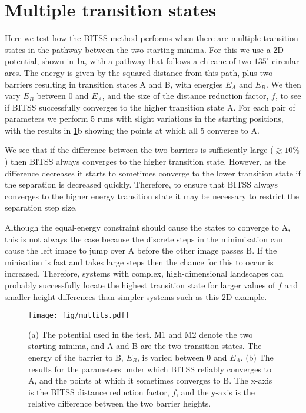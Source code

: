 \documentclass[10pt]{revtex4}
\begin{document}
\section{Multiple transition states}
Here we test how the BITSS method performs when there are multiple transition states in the pathway between the two starting minima.
For this we use a 2D potential, shown in \cref{fig:multits}a, with a pathway that follows a chicane of two $135^\circ$ circular arcs.
The energy is given by the squared distance from this path, plus two barriers resulting in transition states A and B, with energies $E_A$ and $E_B$.
We then vary $E_B$ between 0 and $E_A$, and the size of the distance reduction factor, $f$, to see if BITSS successfully converges to the higher transition state A.
For each pair of parameters we perform 5 runs with slight variations in the starting positions, with the results in \cref{fig:multits}b showing the points at which all 5 converge to A.

We see that if the difference between the two barriers is sufficiently large ($\gtrsim 10\%$) then BITSS always converges to the higher transition state.
However, as the difference decreases it starts to sometimes converge to the lower transition state if the separation is decreased quickly.
Therefore, to ensure that BITSS always converges to the higher energy transition state it may be necessary to restrict the separation step size.

Although the equal-energy constraint should cause the states to converge to A, this is not always the case because the discrete steps in the minimisation can cause the left image to jump over A before the other image passes B.
If the minisation is fast and takes large steps then the chance for this to occur is increased.
Therefore, systems with complex, high-dimensional landscapes can probably successfully locate the highest transition state for larger values of $f$ and smaller height differences than simpler systems such as this 2D example.

\begin{figure}[htb]
  \texttt{[image: fig/multits.pdf]}
  \caption{\label{fig:multits}
    (a) The potential used in the test.
    M1 and M2 denote the two starting minima, and A and B are the two transition states.
    The energy of the barrier to B, $E_B$, is varied between 0 and $E_A$.
    (b) The results for the parameters under which BITSS reliably converges to A, and the points at which it sometimes converges to B.
    The x-axis is the BITSS distance reduction factor, $f$, and the y-axis is the relative difference between the two barrier heights.
  }
\end{figure}
\end{document}
